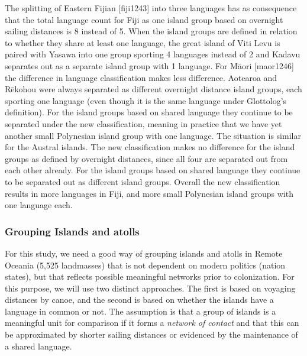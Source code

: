 \documentclass[a4paper,10pt]{article} %
\begin{document}
The splitting of Eastern Fijian [fiji1243] into three languages has as consequence that the total language count for Fiji as one island group based on overnight sailing distances is 8 instead of 5. When the island groups are defined in relation to whether they share at least one language, the great island of Viti Levu is paired with Yasawa into one group sporting 4 languages instead of 2 and Kadavu separates out as a separate island group with 1 language. For M\={a}ori [maor1246] the difference in language classification makes less difference. Aotearoa and  R\={e}kohou were always separated as different overnight distance island groups, each sporting one language (even though it is the same language under Glottolog's definition). For the island groups based on shared language they continue to be separated under the new classification, meaning in practice that we have yet another small Polynesian island group with one language. The situation is similar for the Austral islands. The new classification makes no difference for the island groups as defined by overnight distances, since all four are separated out from each other already. For the island groups based on shared language they continue to be separated out as different island groups. Overall the new classification results in more languages in Fiji, and more small Polynesian island groups with one language each.

\subsubsection{Grouping Islands and atolls}
\label{sec:island_geo}


For this study, we need a good way of grouping islands and atolls in Remote Oceania (5,525 landmasses) that is not dependent on modern politics (nation states), but that reflects possible meaningful networks prior to colonization. For this purpose, we will use two distinct approaches. The first is based on voyaging distances by canoe, and the second is based on whether the islands have a language in common or not. The assumption is that a group of islands is a meaningful unit for comparison if it forms a \textit{network of contact} and that this can be approximated by shorter sailing distances or evidenced by the maintenance of a shared language. 
\end{document}
